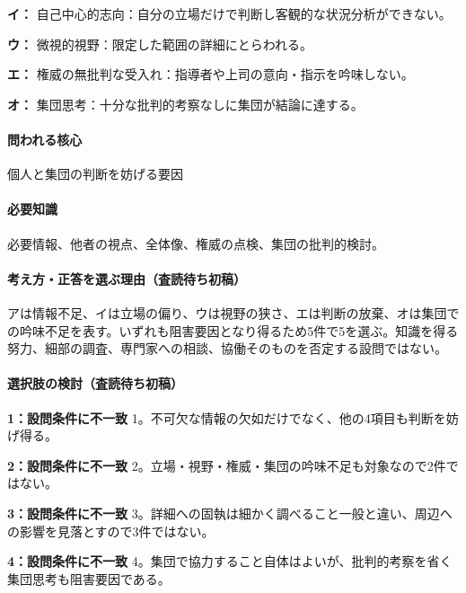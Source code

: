 \noindent\textbf{イ：} 自己中心的志向：自分の立場だけで判断し客観的な状況分析ができない。\par

\noindent\textbf{ウ：} 微視的視野：限定した範囲の詳細にとらわれる。\par

\noindent\textbf{エ：} 権威の無批判な受入れ：指導者や上司の意向・指示を吟味しない。\par

\noindent\textbf{オ：} 集団思考：十分な批判的考察なしに集団が結論に達する。\par

\paragraph{問われる核心} 個人と集団の判断を妨げる要因

\paragraph{必要知識} 必要情報、他者の視点、全体像、権威の点検、集団の批判的検討。

\paragraph{考え方・正答を選ぶ理由（査読待ち初稿）} アは情報不足、イは立場の偏り、ウは視野の狭さ、エは判断の放棄、オは集団での吟味不足を表す。いずれも阻害要因となり得るため5件で5を選ぶ。知識を得る努力、細部の調査、専門家への相談、協働そのものを否定する設問ではない。

\paragraph{選択肢の検討（査読待ち初稿）}\mbox{}\par

\noindent\textbf{1：設問条件に不一致} 1。不可欠な情報の欠如だけでなく、他の4項目も判断を妨げ得る。\par

\noindent\textbf{2：設問条件に不一致} 2。立場・視野・権威・集団の吟味不足も対象なので2件ではない。\par

\noindent\textbf{3：設問条件に不一致} 3。詳細への固執は細かく調べること一般と違い、周辺への影響を見落とすので3件ではない。\par

\noindent\textbf{4：設問条件に不一致} 4。集団で協力すること自体はよいが、批判的考察を省く集団思考も阻害要因である。\par

